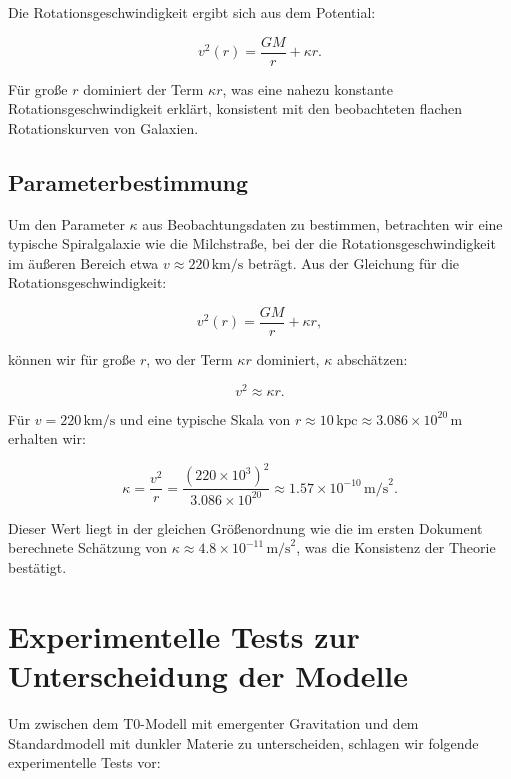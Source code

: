 \documentclass[a4paper,12pt]{article}
\begin{document}
	Die Rotationsgeschwindigkeit ergibt sich aus dem Potential:
	
	\begin{equation}
		v^2(r) = \frac{G M}{r} + \kappa r.
	\end{equation}
	
	Für große \( r \) dominiert der Term \( \kappa r \), was eine nahezu konstante Rotationsgeschwindigkeit erklärt, konsistent mit den beobachteten flachen Rotationskurven von Galaxien.
	
	\subsection{Parameterbestimmung}
	
	Um den Parameter \( \kappa \) aus Beobachtungsdaten zu bestimmen, betrachten wir eine typische Spiralgalaxie wie die Milchstraße, bei der die Rotationsgeschwindigkeit im äußeren Bereich etwa \( v \approx 220 \, \text{km/s} \) beträgt. Aus der Gleichung für die Rotationsgeschwindigkeit:
	
	\begin{equation}
		v^2(r) = \frac{G M}{r} + \kappa r,
	\end{equation}
	
	können wir für große \( r \), wo der Term \( \kappa r \) dominiert, \( \kappa \) abschätzen:
	
	\begin{equation}
		v^2 \approx \kappa r.
	\end{equation}
	
	Für \( v = 220 \, \text{km/s} \) und eine typische Skala von \( r \approx 10 \, \text{kpc} \approx 3.086 \times 10^{20} \, \text{m} \) erhalten wir:
	
	\begin{equation}
		\kappa = \frac{v^2}{r} = \frac{(220 \times 10^3)^2}{3.086 \times 10^{20}} \approx 1.57 \times 10^{-10} \, \text{m/s}^2.
	\end{equation}
	
	Dieser Wert liegt in der gleichen Größenordnung wie die im ersten Dokument berechnete Schätzung von \( \kappa \approx 4.8 \times 10^{-11} \, \text{m/s}^2 \), was die Konsistenz der Theorie bestätigt.
	
	\section{Experimentelle Tests zur Unterscheidung der Modelle}
	
	Um zwischen dem T0-Modell mit emergenter Gravitation und dem Standardmodell mit dunkler Materie zu unterscheiden, schlagen wir folgende experimentelle Tests vor:
	
\end{document}
